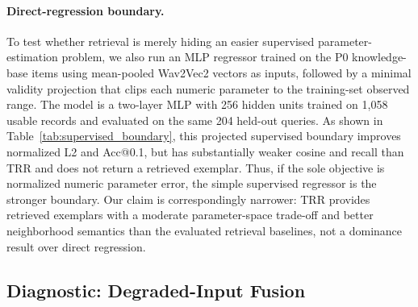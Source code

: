 \paragraph{Direct-regression boundary.}
To test whether retrieval is merely hiding an easier supervised parameter-estimation problem, we also run an MLP regressor trained on the P0 knowledge-base items using mean-pooled Wav2Vec2 vectors as inputs, followed by a minimal validity projection that clips each numeric parameter to the training-set observed range. The model is a two-layer MLP with 256 hidden units trained on 1,058 usable records and evaluated on the same 204 held-out queries. As shown in Table~\ref{tab:supervised_boundary}, this projected supervised boundary improves normalized L2 and Acc@0.1, but has substantially weaker cosine and recall than TRR and does not return a retrieved exemplar. Thus, if the sole objective is normalized numeric parameter error, the simple supervised regressor is the stronger boundary. Our claim is correspondingly narrower: TRR provides retrieved exemplars with a moderate parameter-space trade-off and better neighborhood semantics than the evaluated retrieval baselines, not a dominance result over direct regression.

\begin{table}[t]
\centering
\caption{Supervised range-projected regression boundary on the P0 split. The MLP is stronger on normalized numeric error and Acc@0.1, while TRR preserves retrieved-exemplar semantics and is stronger on recall and cosine.}
\label{tab:supervised_boundary}
\small
{}
\end{table}

\subsection{Diagnostic: Degraded-Input Fusion}
\label{ssec:protocolC}

